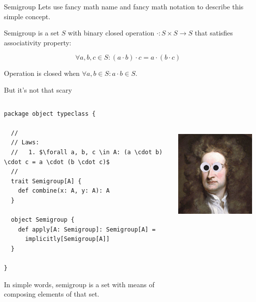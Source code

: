 \documentclass[presentation,aspectratio=169,smaller]{beamer}
\begin{document}
\begin{frame}[label={sec:org766e0e8}]{Semigroup}
Lets use fancy math name and fancy math notation to describe this simple concept.

\alert{Semigroup} is a set \(S\) with binary closed operation \(\cdot : S \times S
\rightarrow S\) that satisfies associativity property:

$$\forall a, b, c \in S : (a \cdot b) \cdot c = a \cdot (b \cdot c)$$

Operation is closed when \(\forall a, b \in S : a \cdot b \in S\).
\end{frame}

\begin{frame}[label={sec:org8195cfa},fragile]{But it’s not that scary}
 \begin{columns}
\begin{column}{0.5\columnwidth}
\begin{verbatim}
package object typeclass {

  //
  // Laws:
  //   1. $\forall a, b, c \in A: (a \cdot b) \cdot c = a \cdot (b \cdot c)$
  //
  trait Semigroup[A] {
    def combine(x: A, y: A): A
  }

  object Semigroup {
    def apply[A: Semigroup]: Semigroup[A] =
      implicitly[Semigroup[A]]
  }

}
\end{verbatim}

\pause

In simple words, semigroup is a set with means of composing elements of that
set.

\pause
\end{column}

\begin{column}{0.5\columnwidth}
\begin{center}
\includegraphics[height=7cm]{images/scary.png}
\end{center}
\end{column}
\end{columns}
\end{frame}
\end{document}
